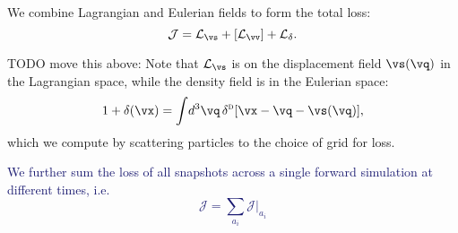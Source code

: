 \documentclass[modern, trackchanges, dvipsnames]{aastex631}
\newcommand{\deltaD}{\delta^\textsc{d}}
\renewcommand{\d}{d}
\newcommand{\cJ}{\mathcal{J}}
\newcommand{\cL}{\mathcal{L}}
\newcommand{\YL}[1]{\textcolor{Bittersweet}{#1}}
\newcommand{\YZ}[1]{\textcolor{MidnightBlue}{#1}}
\begin{document}
We combine Lagrangian and Eulerian fields to form the total loss:
%
\begin{equation}
\cJ = \cL_\vs + [\cL_\vv] + \cL_\delta.
\end{equation}
%

\YL{TODO move this above:}
Note that $\cL_\vs$ is on the displacement field $\vs(\vq)$ in the
Lagrangian space, while the density field is in the Eulerian space:
%
\begin{equation}
1 + \delta(\vx) = \int\!\d^3\vq\, \deltaD[ \vx - \vq - \vs(\vq)],
\end{equation}
%
which we compute by scattering particles to the choice of grid for loss.

\YZ{We further sum the loss of all snapshots across a single forward simulation
at different times, i.e.
\begin{equation}
\cJ = \sum_{a_i} \cJ |_{a_i}
\end{equation}
}
\end{document}
